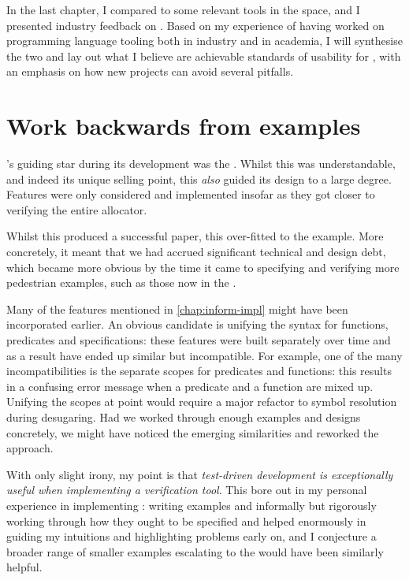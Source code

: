 \margintoc{}

In the last chapter, I compared  to some relevant tools in the
space, and I presented industry feedback on .
Based on my experience of having worked on programming language tooling both in
industry and in academia, I will synthesise the two and lay out what I believe
are achievable standards of usability for , with an emphasis on how new
projects can avoid several pitfalls.

\section{Work backwards from examples}

's guiding star during its development was the . Whilst this was understandable, and indeed its unique selling
point, this \emph{also} guided its design to a large degree. Features were only
considered and implemented insofar as they got  closer to verifying the
entire allocator.

Whilst this produced a successful paper, this over-fitted  to the example.
More concretely, it meant that we had accrued significant technical and design
debt, which became more obvious by the time it came to specifying and verifying
more pedestrian examples, such as those now in the .~

Many of the features mentioned in \cref{chap:inform-impl} might have been
incorporated earlier. An obvious candidate is unifying the syntax for
functions, predicates and specifications: these features were built separately
over time and as a result have ended up similar but
incompatible. For example, one of the many incompatibilities is the separate scopes
for predicates and functions: this results in a confusing error message when
a predicate and a function are mixed up. Unifying the scopes at
point would require a major refactor to symbol resolution during
desugaring. Had we worked through enough examples and designs concretely, we might
have noticed the emerging similarities and reworked the approach.

With only slight irony, my point is that \emph{test-driven development is
exceptionally useful when implementing a verification tool}. This bore out in
my personal experience in implementing : writing examples and
informally but rigorously working through how they ought to be specified and
helped enormously in guiding my intuitions and highlighting problems early on,
and I conjecture a broader range of smaller examples escalating to the
 would have been similarly helpful.

